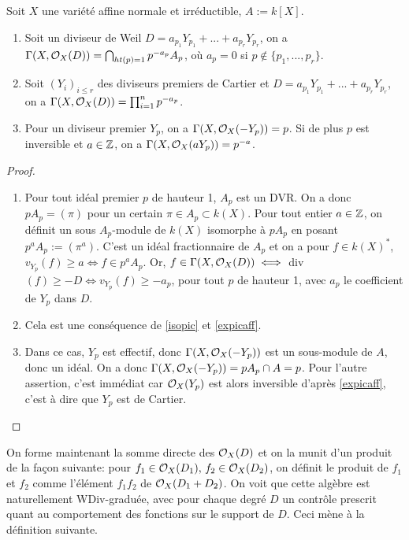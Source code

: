 \begin{prop}\label{divaff}
Soit $X$ une variété affine normale et irréductible, $A:=k[X]$. 
\begin{enumerate}
\item Soit un diviseur de Weil $D=a_{p_1}Y_{p_1}+...+a_{p_r}Y_{p_r}$, on a $\Gamma(X,\mathcal{O}_X(D))=\bigcap_{ht(p)=1}p^{-a_p}A_p$, où $a_p=0$ si $p\notin \lbrace p_1,...,p_r\rbrace$.
\item Soit $(Y_i)_{i\leq r}$ des diviseurs premiers de Cartier et $D=a_{p_1}Y_{p_1}+...+a_{p_r}Y_{p_r}$, on a $\Gamma(X,\mathcal{O}_X(D))=\prod_{i=1}^n p^{-a_p}$.
\item Pour un diviseur premier $Y_p$, on a $\Gamma(X,\mathcal{O}_X(-Y_p))=p$. Si de plus $p$ est inversible et $a\in \mathbb{Z}$, on a $\Gamma(X,\mathcal{O}_X(aY_p))=p^{-a}$.
\end{enumerate}
\end{prop}
\begin{proof}
\begin{enumerate}
\item Pour tout idéal premier $p$ de hauteur 1, $A_p$ est un DVR. On a donc $pA_p=(\pi)$ pour un certain $\pi \in A_p\subset k(X)$. Pour tout entier $a\in \mathbb{Z}$, on définit un sous $A_p$-module de $k(X)$ isomorphe à $pA_p$ en posant $p^aA_p:= (\pi^a)$. C'est un idéal fractionnaire de $A_p$ et on a pour $f\in k(X)^*$, $v_{Y_p}(f)\geq a \iff f\in p^a A_p$.
Or, $f\in \Gamma(X,\mathcal{O}_X(D)) \iff $ div$(f)\geq -D \iff v_{Y_p}(f)\geq -a_p$, pour tout $p$ de hauteur 1, avec $a_p$ le coefficient de $Y_p$ dans $D$.
\item Cela est une conséquence de \ref{isopic} et \ref{expicaff}.

\item Dans ce cas, $Y_p$ est effectif, donc $\Gamma(X,\mathcal{O}_X(-Y_p))$ est un sous-module de $A$, donc un idéal. On a donc $\Gamma(X,\mathcal{O}_X(-Y_p))=pA_p\cap A=p$. Pour l'autre assertion, c'est immédiat car $\mathcal{O}_X(Y_p)$ est alors inversible d'après \ref{expicaff}, c'est à dire que $Y_p$ est de Cartier.
\end{enumerate}
\end{proof}

On forme maintenant la somme directe des $\mathcal{O}_X(D)$ et on la munit d'un produit de la façon suivante: pour $f_1\in \mathcal{O}_X(D_1),\, f_2\in \mathcal{O}_X(D_2)$, on définit le produit de $f_1$ et $f_2$ comme l'élément $f_1f_2$ de $\mathcal{O}_X(D_1+D_2)$. On voit que cette algèbre est naturellement WDiv-graduée, avec pour chaque degré $D$ un contrôle prescrit quant au comportement des fonctions sur le support de $D$. Ceci mène à la définition suivante.

